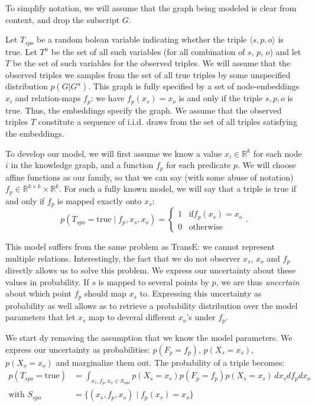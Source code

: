 \documentclass[11pt]{article}
\newcommand{\R}{{\mathbb R}}
\newcommand{\p}{\text{.}}
\begin{document}
To simplify notation, we will assume that the graph being modeled is clear from context, and drop the subscript $G$.

Let $T_{spo}$ be a random bolean variable indicating whether the triple $\langle s, p, o\rangle$ is true. Let $T^u$ be the set of all such variables (for all combination of $s$, $p$, $o$) and let $T$ be the set of such variables for the observed triples. We will assume that the observed triples we samples from the set of all true triples by some unspecified distribution $p(G| G^u)$. This graph is fully specified by a set of node-embeddings $x_i$ and relation-maps $f_p$: we have $f_p(x_s) = x_o$ is and only if the triple $s, p, o$ is true. Thus, the embeddings specify the graph. We assume that the observed triples $T$ constitute a sequence of i.i.d. draws from the set of all triples satisfying the embeddings.

To develop our model, we will first assume we know a value $x_i \in \R^k$ for each node $i$ in the knowledge graph, and a function $f_p$ for each predicate $p$. We will choose affine functions as our family, so that we can say (with some abuse of notation) $f_p \in \R^{k\times k} \times \R^k$. For such a fully known model, we will say that a triple is true if and only if $f_p$ is mapped exactly onto $x_s$:
\[
p(T_{spo} = \text{true} \mid f_p, x_s, x_o) = \begin{cases} 1 & \text{if} f_p(x_s) = x_o \\ 0 & \text{otherwise} \end{cases} \p
\]

This model suffers from the same problem as TransE: we cannot represent multiple relations. Interestingly, the fact that we do not observer $x_s$, $x_o$ and $f_p$ directly allows us to solve this problem. We express our uncertainty about these values in probability. If $s$ is mapped to several points by $p$, we are thus \emph{uncertain} about which point $f_p$ should map $x_s$ to. Expressing this uncertainty as probability as well allows as to retrieve a probability distribution over the model parameters that let $x_s$ map to deveral different $x_o$'s under $f_p$.

We start dy removing the assumption that we know the model parameters. We express our uncertainty as probabilities: $p(F_p = f_p)$, $p(X_s = x_s)$, $p(X_o = x_o)$ and marginalize them out. The probability of a triple becomes:
\begin{align*}
p(T_{spo} = \text{true}) &= \int_{x_s, f_p, x_o \in S_{spo}} p(X_s = x_s) p(F_p = f_p) p(X_s = x_s) \,d x_s df_p dx_o\\
\text{with} \,\,S_{spo} &= \{(x_s, f_p, x_o) \mid f_p(x_s) = x_o\}
\end{align*}
\end{document}
